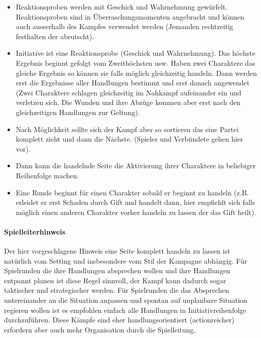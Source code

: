 \documentclass{article}
\begin{document}
\begin{itemize}
\item Reaktionsproben werden mit Geschick und Wahrnehmung gewürfelt. Reaktionsproben sind in Überraschungsmomenten angebracht und können auch ausserhalb des Kampfes verwendet werden (Jemanden rechtzeitig festhalten der abrutscht).
\item Initiative ist eine Reaktionsprobe (Geschick und Wahrnehmung). Das höchste Ergebnis beginnt gefolgt vom Zweithöchsten usw. Haben zwei Charaktere das gleiche Ergebnis so können sie falls möglich gleichzeitig handeln. Dann werden erst die Ergebnisse aller Handlungen bestimmt und erst danach angewendet (Zwei Charaktere schlagen gleichzeitig im Nahkampf aufeinander ein und verletzen sich. Die Wunden und ihre Abzüge kommen aber erst nach den gleichzeitigen Handlungen zur Geltung).
\item Nach Möglichkeit sollte sich der Kampf aber so sortieren das eine Partei komplett zieht und dann die Nächste. (Spieler und Verbündete gehen hier vor).
\item Dann kann die handelnde Seite die Aktivierung ihrer Charaktere in beliebiger Reihenfolge machen.
\item Eine Runde beginnt für einen Charakter sobald er beginnt zu handeln (z.B. erleidet er erst Schaden durch Gift und handelt dann, hier empfiehlt sich falls möglich einen anderen Charakter vorher handeln zu lassen der das Gift heilt).
\end{itemize}

\begin{mdframed}[hidealllines=true, backgroundcolor=black!10]
\paragraph{Spielleiterhinweis}

Der hier vorgeschlagene Hinweis eine Seite komplett handeln zu lassen ist natürlich vom Setting und insbesondere
vom Stil der Kampagne abhängig. Für Spielrunden die ihre Handlungen absprechen wollen und ihre Handlungen
entpannt planen ist diese Regel sinnvoll, der Kampf kann dadurch sogar taktischer und strategischer werden. Für
Spielrunden die das Absprechen untereinander an die Situation anpassen und spontan auf unplanbare Situation regieren
wollen ist es empfohlen einfach alle Handlungen in Initiativreihenfolge durchzuführen. Diese Kämpfe sind eher
handlungsorientiert (actionreicher) erfordern aber auch mehr Organisation durch die Spielleitung.

\end{mdframed}
\end{document}
